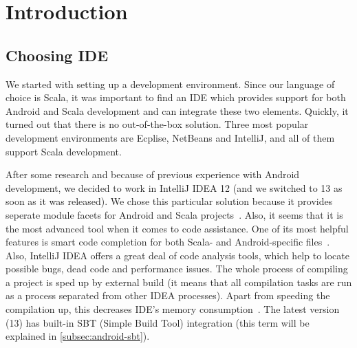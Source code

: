 \textit{}%
%
%
%
%

\section{Introduction}
\label{sec:impl-intro}

\subsection{Choosing IDE}
\label{subsec:choosing-ide}
We started with setting up a development environment. Since our language of choice is Scala, it was important to find an IDE which provides support for both Android and Scala development and can integrate these two elements. Quickly, it turned out that there is no out-of-the-box solution. Three most popular development environments are Ecplise, NetBeans and IntelliJ, and all of them support Scala development. 

After some research and because of previous experience with Android development, we decided to work in IntelliJ IDEA 12 (and we switched to 13 as soon as it was released). We chose this particular solution because it provides seperate module facets for Android and Scala projects~\cite{Steingress:2011:AndroidScala}. Also, it seems that it is the most advanced tool when it comes to code assistance. One of its most helpful features is smart code completion for both Scala- and Android-specific files~\cite{Steingress:2011:AndroidScala}. Also, IntelliJ IDEA offers a great deal of code analysis tools, which help to locate possible bugs, dead code and performance issues. The whole process of compiling a project is sped up by external build (it means that all compilation tasks are run as a process separated from other IDEA processes). Apart from speeding the compilation up, this decreases IDE's memory consumption~\cite{Fatin:2012:NewWay}. The latest version (13) has built-in SBT (Simple Build Tool) integration (this term will be explained in \cref{subsec:android-sbt}).

